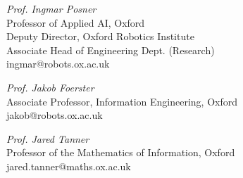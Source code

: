 \documentclass[margin]{res}
\begin{document}
\begin{resume}
                        {\sl Prof. Ingmar Posner}\\
                        Professor of Applied AI, Oxford\\
                        Deputy Director, Oxford Robotics Institute\\
                        Associate Head of Engineering Dept. (Research)\\
                        ingmar@robots.ox.ac.uk

                        {\sl Prof. Jakob Foerster}\\
                        Associate Professor, Information Engineering, Oxford\\
                        jakob@robots.ox.ac.uk

                        {\sl Prof. Jared Tanner}\\
                          Professor of the Mathematics of Information, Oxford\\
                          jared.tanner@maths.ox.ac.uk

\end{resume}
\end{document}
